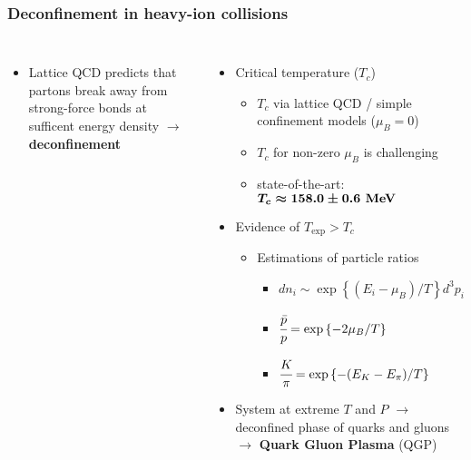 \begin{frame}
  \frametitle{\textbf{Deconfinement in heavy-ion collisions}}
  \begin{columns}
    \begin{itemize}
    \item Lattice QCD predicts that partons break away from strong-force bonds at sufficent energy density $\to$ \textbf{deconfinement}
    \end{itemize}
    \begin{itemize}
    \item Critical temperature ($T_c$)
      \begin{itemize}
      \item $T_c$ via lattice QCD / simple confinement models ($\mu_B = 0$)
      \item $T_c$ for non-zero $\mu_B$ is challenging
      \item state-of-the-art: $\boldmath{T_c \approx 158.0 \pm 0.6 \textbf{ MeV}}$
      \end{itemize}
    \item Evidence of $T_{\text{exp}} > T_c$
      \begin{itemize} 
      \item Estimations of particle ratios
        \begin{itemize}
        \item $dn_i \sim \exp\left\{ (E_i - \mu_B) / T  \right\} d^3 p_i$
        \item $\cfrac{\bar{p}}{p} = \exp\left\{-2\mu_B / T \right\}$
        \item $\cfrac{K}{\pi} = \exp\left\{-(E_K - E_\pi)/T  \right\}$
        \end{itemize}
      
   
      
      \end{itemize}

      \item System at extreme $T$ and $P$ $\to$ deconfined phase of quarks and gluons $\to$ \textbf{Quark Gluon Plasma} (QGP)


\end{itemize}
\end{columns}
\end{frame}
